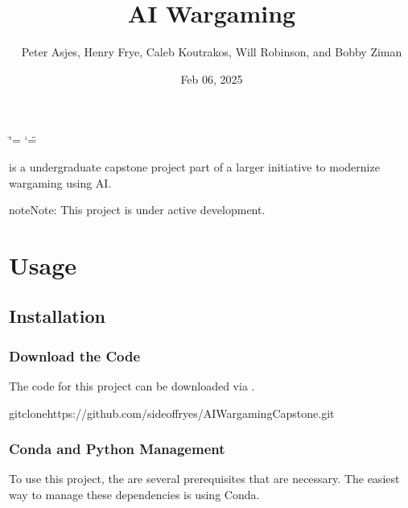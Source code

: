 \documentclass[letterpaper,10pt,english]{sphinxmanual}
\title{AI Wargaming}
\date{Feb 06, 2025}
\author{Peter Asjes, Henry Frye, Caleb Koutrakos, Will Robinson, and Bobby Ziman}
\begin{document}
\ifdefined\shorthandoff
  \ifnum\catcode`\=\string=\active\shorthandoff{=}\fi
  \ifnum\catcode`\"=\active{}\fi
\fi

\pagestyle{empty}
\sphinxmaketitle
\pagestyle{plain}
\sphinxtableofcontents
\pagestyle{normal}
\label{\detokenize{index::doc}}


\sphinxAtStartPar
{} is a undergraduate capstone project part of a larger initiative to modernize wargaming using AI.

\begin{sphinxadmonition}{note}{Note:}
\sphinxAtStartPar
This project is under active development.
\end{sphinxadmonition}

\sphinxstepscope


\chapter{Usage}
\label{\detokenize{usage:usage}}\label{\detokenize{usage::doc}}

\section{Installation}
\label{\detokenize{usage:installation}}

\subsection{Download the Code}
\label{\detokenize{usage:download-the-code}}
\sphinxAtStartPar
The code for this project can be downloaded via .

\begin{sphinxVerbatim}[commandchars=\\\{\}]
gitclonehttps://github.com/sideoffryes/AI\PYGZus{}Wargaming\PYGZus{}Capstone.git
\end{sphinxVerbatim}


\subsection{Conda and Python Management}
\label{\detokenize{usage:conda-and-python-management}}
\sphinxAtStartPar
To use this project, the are several prerequisites that are necessary. The easiest way to manage these dependencies is using Conda.
\end{document}
